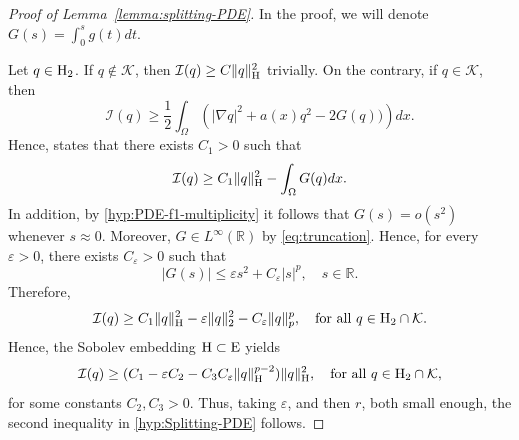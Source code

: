 \documentclass{article}
\newcommand{\boK}{\mathcal{K}}
\newcommand{\boI}{\mathcal{I}}
\newcommand{\R}{\mathbb{R}}
\newcommand{\Hilb}{{\textnormal H}}
\newcommand{\Ebanach}{{\textnormal E}}
\theoremstyle{definition}
\begin{document}
\begin{proof}[Proof of Lemma~\ref{lemma:splitting-PDE}]
In the proof, we will denote $G(s)=\int_0^s g(t)dt$. 

Let $q\in \Hilb_2$. If $q\not\in\boK$, then $\boI(q)\geq C\|q\|_\Hilb^2$ trivially. On the contrary, if $q\in\boK$, then
\[\boI(q)\geq \frac12\int_\Omega\left(|\nabla q|^2+a(x)q^2-2 G(q))\right)dx.\]
Hence, \cite[Lemma 2.15]{Willem} states that there exists $C_1>0$ such that
\[\boI(q)\geq C_1\|q\|_\Hilb^2-\int_\Omega G(q)dx.\]
In addition, by \eqref{hyp:PDE-f1-multiplicity} it follows that $G(s)=o(s^2)$ whenever $s\approx 0$. Moreover,  $G\in L^\infty(\R)$ by \eqref{eq:truncation}. Hence, for every $\varepsilon>0$, there exists $C_\varepsilon>0$ such that
\begin{equation}\label{eq:G-behavior}
    |G(s)|\leq\varepsilon s^2 + C_\varepsilon |s|^p,\quad s\in\R.
\end{equation}
Therefore, 
\[\boI(q)\geq C_1\|q\|_\Hilb^2-\varepsilon\|q\|_2^2- C_\varepsilon\|q\|_p^p,\quad \text{for all }q\in\Hilb_2\cap\boK.\]
Hence, the Sobolev embedding $\Hilb\subset \Ebanach$ yields
\[\boI(q)\geq (C_1-\varepsilon  C_2- C_3 C_\varepsilon\|q\|_\Hilb^{p-2})\|q\|_\Hilb^2,\quad \text{for all }q\in\Hilb_2\cap\boK,\]
for some constants $C_2,C_3>0$. Thus, taking $\varepsilon$, and then $r$, both small enough, the second inequality in \eqref{hyp:Splitting-PDE} follows.


\end{proof}
\end{document}
